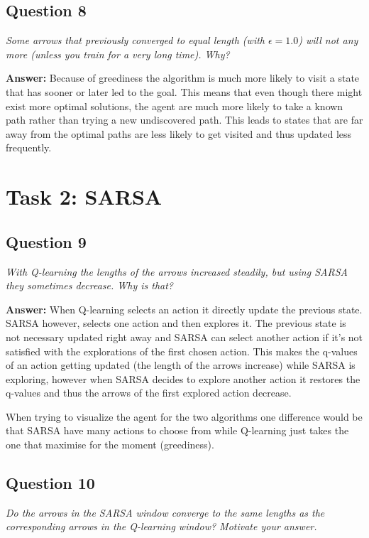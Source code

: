 \documentclass[a4paper]{article}
\begin{document}
\subsection*{Question 8}
\emph{Some arrows that previously converged to equal length (with $\epsilon = 1.0$) will not any more (unless you train for a very long time). Why?}

\textbf{Answer:} Because of greediness the algorithm is much more likely to visit a state that has sooner or later led to the goal. This means that even though there might exist more optimal solutions, the agent are much more likely to take a known path rather than trying a new undiscovered path. 
This leads to states that are far away from the optimal paths are less likely to get visited and thus updated less frequently.

\section{Task 2: SARSA}

\subsection*{Question 9}
\emph{With Q-learning the lengths of the arrows increased steadily, but
using SARSA they sometimes decrease. Why is that?}

\textbf{Answer:} When Q-learning selects an action it directly update the previous state. SARSA however, selects one action and then explores it. The previous state is not necessary updated right away and SARSA can select another action if it's not satisfied with the explorations of the first chosen action. This makes the q-values of an action getting updated (the length of the arrows increase) while SARSA is exploring, however when SARSA decides to explore another action it restores the q-values and thus the arrows of the first explored action decrease.

When trying to visualize the agent for the two algorithms one difference would be that SARSA have many actions to choose from while Q-learning just takes the one that maximise for the moment (greediness).

\subsection*{Question 10}
\emph{Do the arrows in the SARSA window converge to the same
lengths as the corresponding arrows in the Q-learning window? Motivate your answer.}
\end{document}
